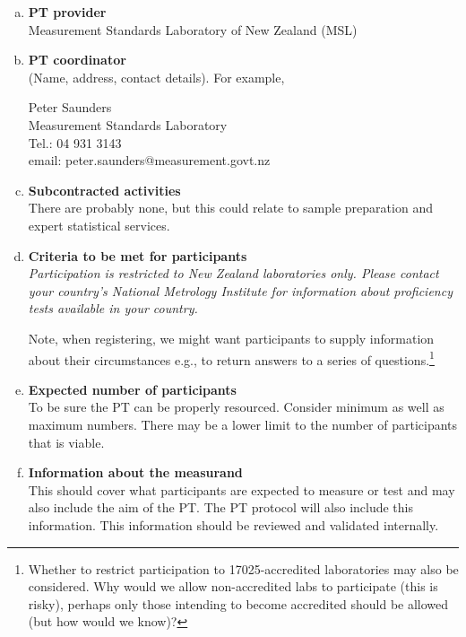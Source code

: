 \begin{enumerate}[a)]
\item	\textbf{PT provider} \\
Measurement Standards Laboratory of New Zealand (MSL)

\item	\textbf{PT coordinator} \\
(Name, address, contact details). For example,

Peter Saunders\\
Measurement Standards Laboratory\\
Tel.: 04 931 3143\\
email: peter.saunders@measurement.govt.nz

\item	\textbf{Subcontracted activities} \\
There are probably none, but this could relate to sample preparation and expert statistical services.

\item	\textbf{Criteria to be met for participants} \\

\textit{Participation is restricted to New Zealand laboratories only.  Please contact your country's National Metrology Institute for information about proficiency tests available in your country.}

\vspace{\baselineskip}
Note, when registering, we might want participants to supply information about their circumstances  e.g., to return answers to a series of questions.\footnote{Whether to restrict participation to 17025-accredited laboratories may also be considered. Why would we allow non-accredited labs to participate (this is risky), perhaps only those intending to become accredited should be allowed (but how would we know)?}

\item	\textbf{Expected number of participants} \\
To be sure the PT can be properly resourced. Consider minimum as well as maximum numbers. There may be a lower limit to the number of participants that is viable. 

\item	\textbf{Information about the measurand} \\ \label{l:measurands}%
This should cover what participants are expected to measure or test and may also include the aim of the PT. The PT protocol will also include this information.  This information should be reviewed and validated internally.


\end{enumerate}
